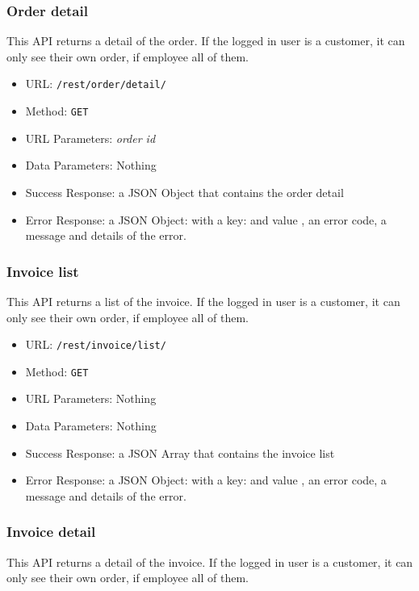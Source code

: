 \subsubsection*{Order detail}

This API returns a detail of the order.
If the logged in user is a customer, it can only see their own order, if employee all of them.

\begin{itemize}
    \item URL: \texttt{/rest/order/detail/}
    \item Method: \texttt{GET}
    \item URL Parameters: \textit{order id}
    \item Data Parameters: Nothing
    \item Success Response: a JSON Object that contains the order detail
    \item Error Response: a JSON Object: with a key:   and value , an error code, a message and details of the error.
\end{itemize}


\subsubsection*{Invoice list}

This API returns a list of the invoice.
If the logged in user is a customer, it can only see their own order, if employee all of them.

\begin{itemize}
    \item URL: \texttt{/rest/invoice/list/}
    \item Method: \texttt{GET}
    \item URL Parameters: Nothing
    \item Data Parameters: Nothing
    \item Success Response:  a JSON Array that contains the invoice list
    \item Error Response: a JSON Object: with a key:   and value , an error code, a message and details of the error.
\end{itemize}

\subsubsection*{Invoice detail}

This API returns a detail of the invoice.
If the logged in user is a customer, it can only see their own order, if employee all of them.

